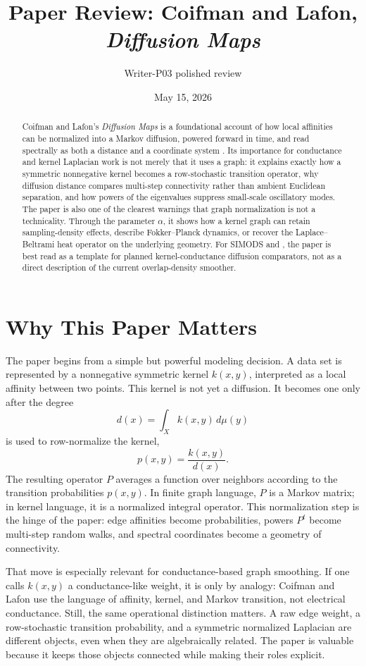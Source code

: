 \documentclass[11pt]{article}
\title{Paper Review: Coifman and Lafon, \emph{Diffusion Maps}}
\author{Writer-P03 polished review}
\date{May 15, 2026}
\begin{document}
\maketitle

\begin{abstract}
Coifman and Lafon's \emph{Diffusion Maps} is a foundational account of how
local affinities can be normalized into a Markov diffusion, powered forward in
time, and read spectrally as both a distance and a coordinate system
\citep{coifman2006diffusion}.  Its importance for conductance and kernel
Laplacian work is not merely that it uses a graph: it explains exactly how a
symmetric nonnegative kernel becomes a row-stochastic transition operator,
why diffusion distance compares multi-step connectivity rather than ambient
Euclidean separation, and how powers of the eigenvalues suppress small-scale
oscillatory modes.  The paper is also one of the clearest warnings that graph
normalization is not a technicality.  Through the parameter $\alpha$, it shows
how a kernel graph can retain sampling-density effects, describe
Fokker--Planck dynamics, or recover the Laplace--Beltrami heat operator on the
underlying geometry.  For SIMODS and , the paper is best read as a
template for planned kernel-conductance diffusion comparators, not as a direct
description of the current overlap-density smoother.
\end{abstract}

\section{Why This Paper Matters}

The paper begins from a simple but powerful modeling decision.  A data set is
represented by a nonnegative symmetric kernel $k(x,y)$, interpreted as a local
affinity between two points.  This kernel is not yet a diffusion.  It becomes
one only after the degree
\[
  d(x) = \int_X k(x,y)\,d\mu(y)
\]
is used to row-normalize the kernel,
\[
  p(x,y) = \frac{k(x,y)}{d(x)}.
\]
The resulting operator $P$ averages a function over neighbors according to the
transition probabilities $p(x,y)$.  In finite graph language, $P$ is a Markov
matrix; in kernel language, it is a normalized integral operator.  This
normalization step is the hinge of the paper: edge affinities become
probabilities, powers $P^t$ become multi-step random walks, and spectral
coordinates become a geometry of connectivity.

That move is especially relevant for conductance-based graph smoothing.  If
one calls $k(x,y)$ a conductance-like weight, it is only by analogy: Coifman
and Lafon use the language of affinity, kernel, and Markov transition, not
electrical conductance.  Still, the same operational distinction matters.  A
raw edge weight, a row-stochastic transition probability, and a symmetric
normalized Laplacian are different objects, even when they are algebraically
related.  The paper is valuable because it keeps those objects connected while
making their roles explicit.
\end{document}
